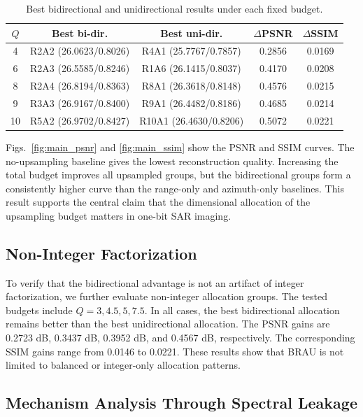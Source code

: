 \documentclass[conference]{IEEEtran}
\begin{document}
\begin{table}[t]
\caption{Best bidirectional and unidirectional results under each fixed budget.}
\begin{center}
\scriptsize
\setlength{\tabcolsep}{2pt}
\begin{tabular}{c c c c c}
\hline
$Q$ & Best bi-dir. & Best uni-dir. & $\Delta$PSNR & $\Delta$SSIM \\
\hline
4  & R2A2 (26.0623/0.8026) & R4A1 (25.7767/0.7857)  & 0.2856 & 0.0169 \\
6  & R2A3 (26.5585/0.8246) & R1A6 (26.1415/0.8037)  & 0.4170 & 0.0208 \\
8  & R2A4 (26.8194/0.8363) & R8A1 (26.3618/0.8148)  & 0.4576 & 0.0215 \\
9  & R3A3 (26.9167/0.8400) & R9A1 (26.4482/0.8186)  & 0.4685 & 0.0214 \\
10 & R5A2 (26.9702/0.8427) & R10A1 (26.4630/0.8206) & 0.5072 & 0.0221 \\
\hline
\end{tabular}
\label{tab:main_gain}
\end{center}
\end{table}

Figs.~\ref{fig:main_psnr} and \ref{fig:main_ssim} show the PSNR and SSIM curves. The no-upsampling baseline gives the lowest reconstruction quality. Increasing the total budget improves all upsampled groups, but the bidirectional groups form a consistently higher curve than the range-only and azimuth-only baselines. This result supports the central claim that the dimensional allocation of the upsampling budget matters in one-bit SAR imaging.

\subsection{Non-Integer Factorization}

To verify that the bidirectional advantage is not an artifact of integer factorization, we further evaluate non-integer allocation groups. The tested budgets include $Q=3,4.5,5,7.5$. In all cases, the best bidirectional allocation remains better than the best unidirectional allocation. The PSNR gains are 0.2723 dB, 0.3437 dB, 0.3952 dB, and 0.4567 dB, respectively. The corresponding SSIM gains range from 0.0146 to 0.0221. These results show that BRAU is not limited to balanced or integer-only allocation patterns.

\subsection{Mechanism Analysis Through Spectral Leakage}
\end{document}

